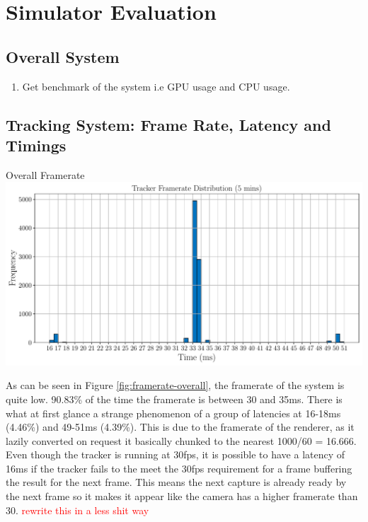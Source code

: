 \section{Simulator Evaluation}

\subsection{Overall System}
\begin{enumerate}
	\item Get benchmark of the system i.e GPU usage and CPU usage.
\end{enumerate}


\subsection{Tracking System: Frame Rate, Latency and Timings}

\begin{figureBox}[label={fig:framerate-overall}, width=1.0\linewidth]{Overall Framerate}
	\includegraphics[width = 1.0\linewidth]{./evaluation/figures/framerate-overall.pdf}
\end{figureBox}

As can be seen in Figure \ref{fig:framerate-overall}, the framerate of the system is quite low. 90.83\% of the time the framerate is between 30 and 35ms. There is what at first glance a strange phenomenon of a group of latencies at 16-18ms (4.46\%) and 49-51ms (4.39\%). This is due to the framerate of the renderer, as it lazily converted on request it basically chunked to the nearest 1000/60 = 16.666. Even though the tracker is running at 30fps, it is possible to have a latency of 16ms if the tracker fails to the meet the 30fps requirement for a frame buffering the result for the next frame. This means the next capture is already ready by the next frame so it makes it appear like the camera has a higher framerate than 30. \textcolor{red}{rewrite this in a less shit way}

